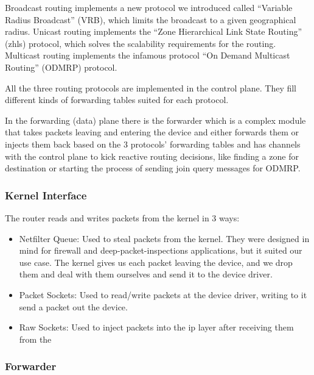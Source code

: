 Broadcast routing implements a new protocol we introduced called ``Variable Radius Broadcast'' (VRB), which limits the broadcast to a given geographical radius.
Unicast routing implements the ``Zone Hierarchical Link State Routing'' (\acrshort{zhls}) protocol, which solves the scalability requirements for the routing.
Multicast routing implements the infamous protocol ``On Demand Multicast Routing'' (ODMRP) protocol.

All the three routing protocols are implemented in the control plane.
They fill different kinds of forwarding tables suited for each protocol.

In the forwarding (data) plane there is the forwarder which is a complex module that takes packets leaving and entering the device and either forwards them or injects them back based on the 3 protocols' forwarding tables and has channels with the control plane to kick reactive routing decisions, like finding a zone for destination or starting the process of sending join query messages for ODMRP.

\subsubsection{Kernel Interface} 
The router reads and writes packets from the kernel in 3 ways:
\begin{itemize}[itemsep=1pt, topsep=5pt]
    \item Netfilter Queue: Used to steal packets from the kernel. They were designed in mind for firewall and deep-packet-inspections applications, but it suited our use case. The kernel gives us each packet leaving the device, and we drop them and deal with them ourselves and send it to the device driver.
    \item Packet Sockets: Used to read/write packets at the device driver, writing to it send a packet out the device.
    \item Raw Sockets: Used to inject packets into the \acrshort{ip} layer after receiving them from the 
\end{itemize}

\subsubsection{Forwarder}

